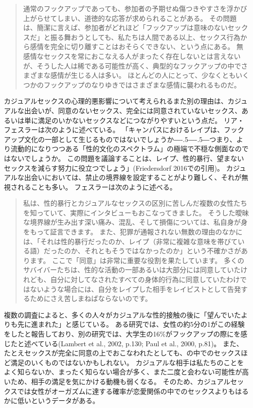 \documentclass[paper=a4,book,openany]{jlreq}
\def\DDASH{―\kern-.5\zw―\kern-.5\zw―} %
\begin{document}
\begin{quote}
 通常のフックアップであっても、参加者の予期せぬ傷つきやすさを浮かび上がらせてしまい、道徳的な応答が求められることがある。
その問題は、簡潔に言えば、参加者がどれほど「フックアップは意味のないセックスだ」と振る舞おうとしても、私たちは人間である以上、セックス行為から感情を完全に切り離すことはおそらくできない、という点にある。
無感情なセックスを常におこなえる人がまったく存在しないとは言えないが、そうした人は稀である可能性が高く、典型的なフックアップの中でさまざまな感情が生じる人は多い。
ほとんどの人にとって、少なくともいくつかのフックアップのなりゆきではさまざまな感情に襲われるものだ。
\citep[Chapter 7]{rocha19}
\end{quote}

カジュアルセックスの心理的悪影響について考えられるまた別の理由は、カジュアルな出会いが、同意のないセックス、完全には同意されていないセックス、あるいは単に満足のいかないセックスなどにつながりやすいという点だ。
リア・フェスラーは次のように述べている。
「キャンパスにおけるレイプは、フックアップ文化の一部として生じるものではないでしょうか{\DDASH}つまり、より流動的になりつつある「性的文化のスペクトラム」の極端で不穏な側面なのではないでしょうか。
この問題を議論することは、レイプ、性的暴行、望まないセックスを減らす努力に役立つでしょう」(Friedersdorf 2016での引用)\nocite{friedersdorf16:_how_does_hook}。
カジュアルな出会いにおいては、禁止の境界線を設定することがより難しく、それが無視されることも多い。
フェスラーは次のように述べる。

\begin{quote}
 私は、性的暴行とカジュアルなセックスの区別に苦しんだ複数の女性たちを知っていて、実際にインタビューもおこなってきました。
そうした曖昧な境界線が生み出す深い痛み、混乱、そして損傷については、私自身が身をもって証言できます。
また、犯罪が通報されない無数の理由のなかには、「それは性的暴行だったのか、レイプ（非常に複雑な意味を帯びている語）だったのか、それともそうではなかったのか」という不確かさがあります。
ここで「同意」は非常に重要な役割を果たしています。
多くのサバイバーたちは、性的な活動の一部あるいは大部分には同意していたけれども、自分に対してなされたすべての身体的行為に同意していたわけではないような場合には、自分をレイプした相手をレイピストとして告発するためにさえ苦しまねばならないのです。
\citep{friedersdorf16:_how_does_hook}
\end{quote}

複数の調査によると、多くの人々がカジュアルな性的接触の後に「望んでいたよりも先に進まれた」と感じている。
ある研究では、女性の約5分の1がこの経験をしたと報告しており、別の研究では、大学生の16\%がフックアップの際にを感じたと述べている(Lambert et al., 2002, p.130; Paul et al., 2000, p.81)。
\nocite{lambert02:_plur_ignor_hook_up}\nocite{paul00:_hook}
また、たとえセックスが完全に同意の上でおこなわれたとしても、の中でのセックスほど満足のいくものではないかもしれない。
カジュアルな相手は私たちのことをよく知らないか、まったく知らない場合が多く、また二度と会わない可能性が高いため、相手の満足を気にかける動機も弱くなる。
そのため、カジュアルセックスでは女性がオーガズムに達する確率が恋愛関係の中でのセックスよりもはるかに低いというデータがある\citep{armstrong10:_orgas_coll_hook_relat}。
\end{document}
